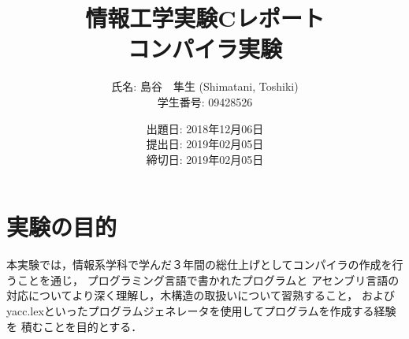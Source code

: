 \documentclass[a4paper,11pt]{jarticle}
\title{情報工学実験Cレポート \\
      コンパイラ実験}
\author{氏名: 島谷　隼生 (Shimatani, Toshiki) \\
        学生番号: 09428526}
\date{出題日: 2018年12月06日 \\
      提出日: 2019年02月05日 \\
      締切日: 2019年02月05日 \\}  %
\begin{document}
\maketitle


\section{実験の目的}

本実験では，情報系学科で学んだ３年間の総仕上げとしてコンパイラの作成を行うことを通じ，
プログラミング言語で書かれたプログラムと
アセンブリ言語の対応についてより深く理解し，木構造の取扱いについて習熟すること，
およびyacc.lexといったプログラムジェネレータを使用してプログラムを作成する経験を
積むことを目的とする．

\end{document}
